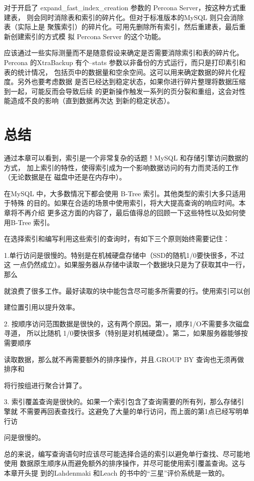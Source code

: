 对于开启了 expand\_fast\_index\_creation 参数的 Percona Server，按这种方式重建表，
则会同时消除表和索引的碎片化。但对于标准版本的MySQL 则只会消除表（实际上是
聚簇索引）的碎片化。可用先删除所有索引，然后重建表，最后重新创建索引的方式模
拟 Percona Server 的这个功能。

应该通过一些实际测量而不是随意假设来确定是否需要消除索引和表的碎片化。Percona
的XtraBackup 有个--stats 参数以非备份的方式运行，而只是打印素引和表的统计情况，
包括页中的数据量和空余空间。这可以用来确定数据的碎片化程度。另外也要考虑数据
是否已经达到稳定状态，如果你进行碎片整理将数据压缩到一起，可能反而会导致后续
的更新操作触发一系列的页分裂和重组，这会对性能造成不良的影响（直到数据再次达
到新的稳定状态）。

\section{总结}
通过本章可以看到，索引是一个非常复杂的话题！MySQL 和存储引擎访问数据的方式，
加上索引的特性，使得索引成为一个影响数据访问的有力而灵活的工作（无论数据是在
磁盘中还是在内存中）。

在MySQL 中，大多数情况下都会使用 B-Tree 索引。其他类型的索引大多只适用于特殊
的目的。如果在合适的场景中使用索引，将大大提高查询的响应时间。本章将不再介绍
更多这方面的内容了，最后值得总的回顾一下这些特性以及如何使用B-Tree 索引。

在选择索引和编写利用这些索引的查询时，有如下三个原则始终需要记住：

1.单行访问是很慢的。特别是在机械硬盘存储中（SSD的随机1/0要快很多，不过这
一点仍然成立）。如果服务器从存储中读取一个数据块只是为了获取其中一行，那么

就浪费了很多工作。最好读取的块中能包含尽可能多所需要的行。使用索引可以创

建位置引用以提升效率。

2. 按顺序访问范围数据是很快的，这有两个原因。第一，顺序1/O不需要多次磁盘寻道，
所以比随机 1/0要快很多（特别是对机械硬盘）。第二，如果服务器能够按需要顺序

读取数据，那么就不再需要额外的排序操作，并且.GROUP BY 查询也无须再做排序和

将行按组进行聚合计算了。

3. 索引覆盖查询是很快的。如果一个索引包含了查询需要的所有列，那么存储引擎就
不需要再回表查找行。这避免了大量的单行访问，而上面的第1点已经写明单行访

问是很慢的。

总的来说，编写查询语句时应该尽可能选择合适的索引以避免单行查找、尽可能地使用
数据原生顺序从而避免额外的排序操作，并尽可能使用索引覆盖查询。这与本章开头提
到的Lahdenmaki 和Leach 的书中的“三星”评价系统是一致的。

